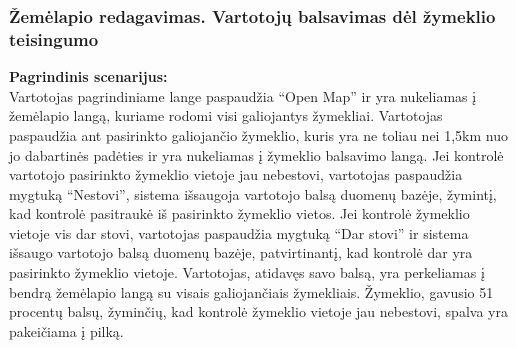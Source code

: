\documentclass{VUMIFPSkursinis}
\begin{document}
\subsubsection{Žemėlapio redagavimas. Vartotojų balsavimas dėl žymeklio teisingumo}
	\textbf{Pagrindinis scenarijus:}\\
	Vartotojas pagrindiniame lange paspaudžia “Open Map” ir yra nukeliamas į žemėlapio langą, kuriame rodomi visi galiojantys žymekliai. 
	Vartotojas paspaudžia ant pasirinkto galiojančio žymeklio, kuris yra ne toliau nei 1,5km nuo jo dabartinės padėties ir yra nukeliamas 
	į žymeklio balsavimo langą. Jei kontrolė vartotojo pasirinkto žymeklio vietoje jau nebestovi, vartotojas paspaudžia mygtuką “Nestovi”, 
	sistema išsaugoja vartotojo balsą duomenų bazėje, žymintį, kad kontrolė pasitraukė iš pasirinkto žymeklio vietos. Jei kontrolė žymeklio 
	vietoje vis dar stovi, vartotojas paspaudžia mygtuką “Dar stovi” ir sistema išsaugo vartotojo balsą duomenų bazėje, patvirtinantį, kad 
	kontrolė dar yra pasirinkto žymeklio vietoje. Vartotojas, atidavęs savo balsą, yra perkeliamas į bendrą žemėlapio langą su visais 
	galiojančiais žymekliais. Žymeklio, gavusio 51 procentų balsų, žyminčių, kad kontrolė žymeklio vietoje jau nebestovi, spalva yra pakeičiama į pilką.
\end{document}
